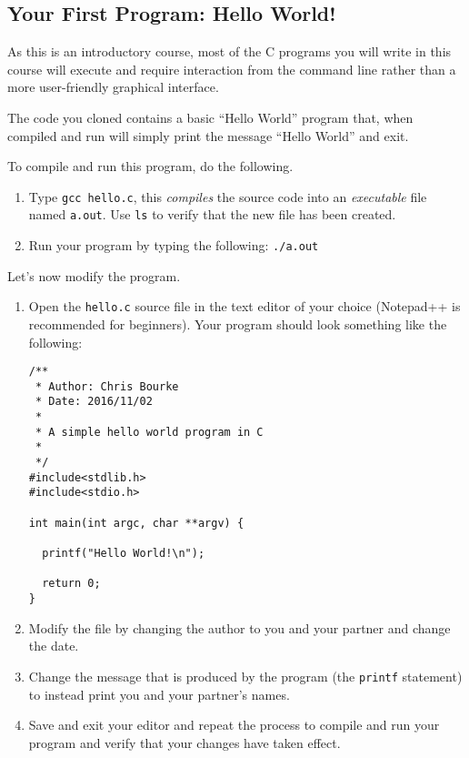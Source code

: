 \documentclass[12pt]{scrartcl}
\begin{document}
\subsection{Your First Program: Hello World!}

As this is an introductory course, most of the C programs you will write in 
this course will execute and require interaction from the command line 
rather than a more user-friendly graphical interface.  

The code you cloned contains a basic ``Hello World'' program that, when
compiled and run will simply print the message ``Hello World'' and exit.

To compile and run this program, do the following.
\begin{enumerate}
  \item Type \texttt{gcc hello.c}, this \emph{compiles} the source code
  	into an \emph{executable} file named \texttt{a.out}.  Use 
	\texttt{ls} to verify that the new file has been created.  
  \item Run your program by typing the following: \texttt{./a.out}
\end{enumerate}

Let's now modify the program. 

\begin{enumerate}
  \item Open the \texttt{hello.c} source file in the text editor of
  	your choice (Notepad++ is recommended for beginners).
  	Your program should look something like the following:

\begin{verbatim}
/**
 * Author: Chris Bourke
 * Date: 2016/11/02
 *
 * A simple hello world program in C
 *
 */
#include<stdlib.h>
#include<stdio.h>

int main(int argc, char **argv) {

  printf("Hello World!\n");

  return 0;
}
\end{verbatim}
  \item Modify the file by changing the author to you and your partner and change
  	the date.
  \item Change the message that is produced by the program (the
    \texttt{printf} statement) to instead
  	print you and your partner's names.
  \item Save and exit your editor and repeat the process to compile and run
  	your program and verify that your changes have taken effect.
\end{enumerate}
\end{document}
